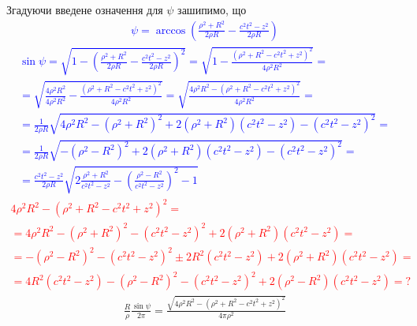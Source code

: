 Згадуючи введене означення для $ \psi $ зашипимо, що
%
\textcolor{blue}{ \begin{equation*} \begin{aligned}
\psi = \arccos \left( \frac{\rho^2 + R^2}{2 \rho R} - 
\frac{c^2 t^2 - z^2}{2 \rho R} \right)
\end{aligned} \end{equation*} }
%
\textcolor{blue}{ \begin{equation*} \begin{aligned}
\sin \psi = \sqrt{1 - \left( \frac{\rho^2 + R^2}{2 \rho R} - 
\frac{c^2 t^2 - z^2}{2 \rho R} \right)^2} = 
\sqrt{1 - \frac{\left( \rho^2 + R^2 - c^2 t^2 + z^2 \right)^2}
{4 \rho^2 R^2} } = \\ = \sqrt{\frac{4 \rho^2 R^2}{4 \rho^2 R^2} - 
\frac{\left( \rho^2 + R^2 - c^2 t^2 + z^2 \right)^2}{4 \rho^2 R^2} } =
\sqrt{\frac{4 \rho^2 R^2 - \left( \rho^2 + R^2 - c^2 t^2 + z^2 \right)^2}
{4 \rho^2 R^2}} = \\
= \frac{1}{2 \rho R} \sqrt{4 \rho^2 R^2 - \left( \rho^2 + R^2 \right)^2 +
2 \left( \rho^2 + R^2 \right) \left( c^2 t^2 - z^2 \right) - 
\left( c^2 t^2 - z^2 \right)^2} = \\
= \frac{1}{2 \rho R} \sqrt{- \left( \rho^2 - R^2 \right)^2 +
2 \left( \rho^2 + R^2 \right) \left( c^2 t^2 - z^2 \right) - 
\left( c^2 t^2 - z^2 \right)^2} = \\
= \frac{c^2 t^2 - z^2}{2 \rho R} \sqrt{2 \frac{\rho^2 + R^2 }{c^2 t^2 - z^2} - 
\left( \frac{\rho^2 - R^2 }{c^2 t^2 - z^2} \right)^2 - 1}
\end{aligned} \end{equation*} }
%
\textcolor{red}{ \begin{equation*} \begin{aligned}
4 \rho^2 R^2 - (\rho^2 + R^2 - c^2 t^2 + z^2)^2 = \\
= 4 \rho^2 R^2 - (\rho^2 + R^2)^2 - (c^2 t^2 - z^2)^2 + 
2 (\rho^2 + R^2) (c^2 t^2 - z^2) = \\
= - (\rho^2 - R^2)^2 - (c^2 t^2 - z^2)^2 \pm 
2 R^2 (c^2 t^2 - z^2) + 2 (\rho^2 + R^2) (c^2 t^2 - z^2) = \\
= 4 R^2 (c^2 t^2 - z^2) - (\rho^2 - R^2)^2 - (c^2 t^2 - z^2)^2 +
2 (\rho^2 - R^2) (c^2 t^2 - z^2) = ?
\end{aligned} \end{equation*} }
%
\begin{equation*} \begin{aligned}
\frac{R}{\rho} \frac{\sin \psi}{2 \pi} = 
\frac{\sqrt{4 \rho^2 R^2 - (\rho^2 + R^2 - c^2t^2 + z^2)^2}}{4 \pi \rho^2}
\end{aligned} \end{equation*}
